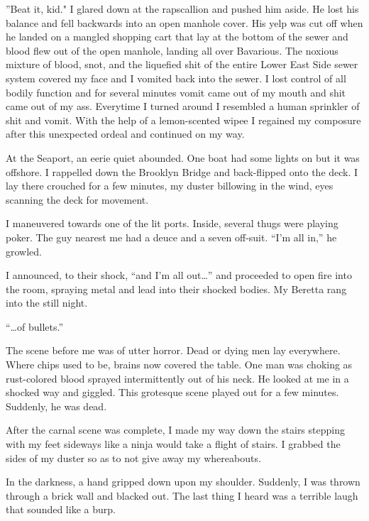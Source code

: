 ''Beat it, kid." I glared down at the rapscallion and pushed him
aside. He lost his balance and fell backwards into an open manhole
cover. His yelp was cut off when he landed on a mangled shopping
cart that lay at the bottom of the sewer and blood flew out of the
open manhole, landing all over Bavarious. The noxious mixture of
blood, snot, and the liquefied shit of the entire Lower East Side
sewer system covered my face and I vomited back into the sewer. I
lost control of all bodily function and for several minutes vomit
came out of my mouth and shit came out of my ass. Everytime I
turned around I resembled a human sprinkler of shit and vomit. With
the help of a lemon-scented wipee I regained my composure after
this unexpected ordeal and continued on my way.



At the Seaport, an eerie quiet abounded. One boat had some lights
on but it was offshore. I rappelled down the Brooklyn Bridge and
back-flipped onto the deck. I lay there crouched for a few minutes, my
duster billowing in the wind, eyes scanning the deck for
movement.



I maneuvered towards one of the lit ports. Inside, several thugs
were playing poker. The guy nearest me had a deuce and a seven
off-suit. ``I'm all in,'' he growled.



I announced, to their shock, ``and I'm all
out{\ldots}'' and proceeded to open fire into the room,
spraying metal and lead into their shocked bodies. My Beretta rang
into the still night.



``{\ldots}of bullets.''



The scene before me was of utter horror. Dead or dying men lay
everywhere. Where chips used to be, brains now covered the table.
One man was choking as rust-colored blood sprayed intermittently
out of his neck. He looked at me in a shocked way and giggled. This
grotesque scene played out for a few minutes. Suddenly, he was
dead.



After the carnal scene was complete, I made my way down the stairs
stepping with my feet sideways like a ninja would take a flight of
stairs. I grabbed the sides of my duster so as to not give away my
whereabouts.



In the darkness, a hand gripped down upon my shoulder. Suddenly, I
was thrown through a brick wall and blacked out. The last thing I
heard was a terrible laugh that sounded like a burp.



